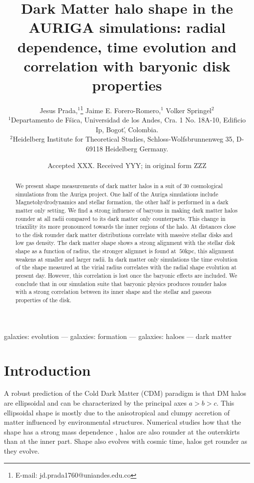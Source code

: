 \documentclass[a4paper,fleqn,usenatbib]{mnras}
\title[The shape of dark matter haloes in the AURIGA simulations]
{Dark Matter halo shape in the AURIGA simulations: radial
  dependence, time evolution and correlation with baryonic disk
  properties}
\author[Jesus Prada,  Jaime E. Forero-Romero, Volker Springel ]{
Jesus Prada,$^{1}$\thanks{E-mail: jd.prada1760@uniandes.edu.co}
Jaime E. Forero-Romero,$^{1}$
Volker Springel$^{2}$
\\
$^{1}$Departamento de F\'sica, Universidad de los Andes, Cra. 1 No.
18A-10, Edificio Ip, Bogot\', Colombia.\\
$^{2}$Heidelberg Institute for Theoretical Studies, Schloss-Wolfsbrunnenweg 35, D-69118 Heidelberg
Germany.\\
}
\date{Accepted XXX. Received YYY; in original form ZZZ}
\begin{document}
\label{firstpage}
\pagerange{\pageref{firstpage}--\pageref{lastpage}}
\maketitle

\begin{abstract}
We present shape measurements of dark matter halos in a suit
of 30 cosmological simulations from the Auriga project.
One half of the Auriga simulations include Magnetohydrodynamics and stellar
formation, the other half is performed in a dark matter only setting.
We find a strong influence of baryons in making dark matter halos rounder at all
radii compared to its dark matter only counterparts.
This change in triaxility its more pronounced towards the inner
regions of the halo.
At distances close to the disk rounder dark matter distributions
correlate with massive stellar disks and low gas density.
The dark matter shape shows a strong alignment with the
stellar disk shape as a function of radius, the stronger aligmnet is
found at $~50$kpc, this alignment weakens at smaller and larger radii. 
In dark matter only simulations the time evolution of the shape
measured at the virial radius correlates with the radial shape
evolution at present day.  
However, this correlation is lost once the baryonic effects are
included. 
We conclude that in our simulation suite that baryonic physics
produces rounder halos with a strong correlation between its inner
shape and the stellar and gaseous properties of the disk.
\end{abstract}

\begin{keywords}
galaxies: evolution --- galaxies: formation --- galaxies: haloes ---
dark matter
\end{keywords}



\section{Introduction}


A robust prediction of the Cold Dark Matter (CDM) paradigm is that DM
halos are ellipsoidal and can be characterized by the principal axes
$a>b>c$.
This ellipsoidal shape is mostly due to the anisotropical and
clumpy accretion of matter influenced by environmental structures.
Numerical studies how that the shape has a strong mass dependence
\citep{Allgood_et_al._2006}, halos are also rounder at the outerskirts
than at the inner part. 
Shape also evolves with cosmic time, halos get
rounder as they evolve.  
\end{document}
